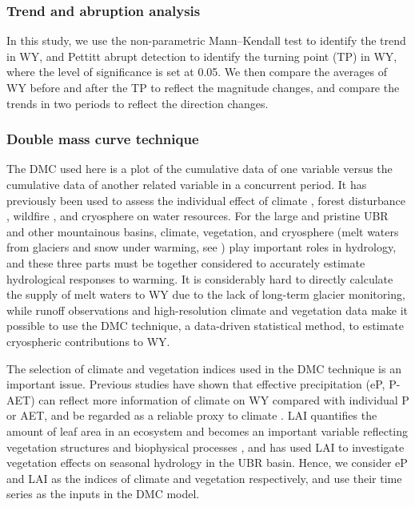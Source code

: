 \documentclass[hess, manuscript]{copernicus}
\begin{document}
\subsubsection{Trend and abruption analysis}
In this study, we use the non-parametric Mann--Kendall test \citep{kendall1938new,mann1945nonparametric} to identify the trend in WY, and Pettitt abrupt detection \citep{pettitt1979non} to identify the turning point (TP) in WY, where the level of significance is set at 0.05. 
We then compare the averages of WY before and after the TP to reflect the magnitude changes, and compare the trends in two periods to reflect the direction changes.

\subsubsection{Double mass curve technique}
The DMC used here is a plot of the cumulative data of one variable versus the cumulative data of another related variable in a concurrent period.
It has previously been used to assess the individual effect of climate \citep{gao2011changes}, forest disturbance \citep{wei2010quantifying}, wildfire \citep{hallema2018burned}, and cryosphere \citep{brahney2017determining} on water resources.
For the large and pristine UBR and other mountainous basins, climate, vegetation, and cryosphere (melt waters from glaciers and snow under warming, see \citealt{biemans2019importance,huss2018global}) play important roles in hydrology, and these three parts must be together considered to accurately estimate hydrological responses to warming. 
It is considerably hard to directly calculate the supply of melt waters to WY due to the lack of long-term glacier monitoring, while runoff observations and high-resolution climate and vegetation data make it possible to use the DMC technique, a data-driven statistical method, to estimate cryospheric contributions to WY.  

The selection of climate and vegetation indices used in the DMC technique is an important issue.
Previous studies have shown that effective precipitation (eP, P-AET) can reflect more information of climate on WY compared with individual P or AET, and be regarded as a reliable proxy to climate \citep{wei2010quantifying,zhang2019separating}. 
LAI quantifies the amount of leaf area in an ecosystem and becomes an important variable reflecting vegetation structures and biophysical processes \citep{fang2019overview, forzieri2020increased}, and \citet{li2021vegetation} has used LAI to investigate vegetation effects on seasonal hydrology in the UBR basin. 
Hence, we consider eP and LAI as the indices of climate and vegetation respectively, and use their time series as the inputs in the DMC model. 
\end{document}
